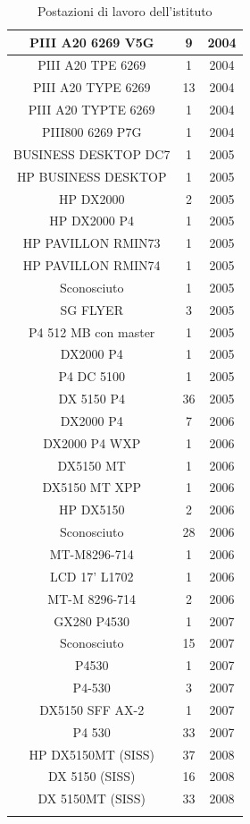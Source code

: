 \documentclass[12pt, a4paper, titlepage]{report}
\begin{document}
\begin{longtable}{| c | c | c |}
		PIII A20 6269 V5G & 9 & 2004 \\ \hline
		PIII A20 TPE 6269 & 1 & 2004 \\ \hline
		PIII A20 TYPE 6269 & 13 & 2004 \\ \hline
		PIII A20 TYPTE 6269 & 1 & 2004 \\ \hline
		PIII800 6269 P7G & 1 & 2004 \\ \hline
		BUSINESS DESKTOP DC7 & 1 & 2005 \\ \hline
		HP BUSINESS DESKTOP & 1 & 2005 \\ \hline
		HP DX2000 & 2 & 2005 \\ \hline
		HP DX2000 P4 & 1 & 2005 \\ \hline
		HP PAVILLON RMIN73 & 1 & 2005 \\ \hline
		HP PAVILLON RMIN74 & 1 & 2005 \\ \hline
		Sconosciuto & 1 & 2005 \\ \hline
		SG FLYER & 3 & 2005 \\ \hline
		P4 512 MB con master & 1 & 2005 \\ \hline
		DX2000 P4 & 1 & 2005 \\ \hline
		P4 DC 5100 & 1 & 2005 \\ \hline
		DX 5150 P4 & 36 & 2005 \\ \hline
		DX2000 P4 & 7 & 2006 \\ \hline
		DX2000 P4 WXP & 1 & 2006 \\ \hline
		DX5150 MT & 1 & 2006 \\ \hline
		DX5150 MT XPP & 1 & 2006 \\ \hline
		HP DX5150 & 2 &  2006\\ \hline
		Sconosciuto & 28 & 2006 \\ \hline
		MT-M8296-714 & 1 & 2006 \\ \hline
		LCD 17' L1702 & 1 & 2006 \\ \hline
		MT-M 8296-714 & 2 & 2006 \\ \hline
		GX280 P4530 & 1 & 2007 \\ \hline
		Sconosciuto & 15 & 2007 \\ \hline
		P4530 & 1 & 2007 \\ \hline
		P4-530 & 3 & 2007 \\ \hline
		DX5150 SFF AX-2 & 1 & 2007 \\ \hline
		P4 530 & 33 & 2007 \\ \hline
		HP DX5150MT (SISS) & 37 & 2008 \\ \hline
		DX 5150 (SISS) & 16 & 2008 \\ \hline
		DX 5150MT (SISS) & 33 & 2008 \\ \hline
		\caption{Postazioni di lavoro dell'istituto}
		\end{longtable}
\end{document}
